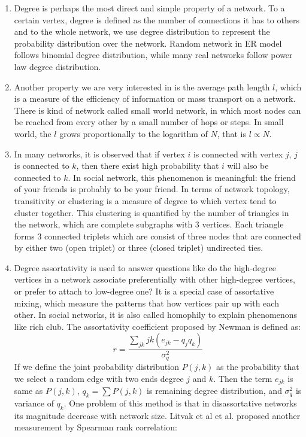 \documentclass[symmetry,article,submit,moreauthors,pdftex,10pt,a4paper]{Definitions/mdpi}
\makeatletter
\newcommand*{\etal}{%
    \@ifnextchar{.}%
        {et al}%
        {et al.\@\xspace}%
}
\makeatother
\begin{document}
\begin{enumerate}
\item Degree is perhaps the most direct and simple property of a network. To a certain vertex, degree is defined as the number of connections it has to others and to the whole network, we use degree distribution to represent the probability distribution over the network. Random network in ER model follows binomial degree distribution, while many real networks follow power law degree distribution.
\item Another property we are very interested in is the average path length $l$, which is a measure of the efficiency of information or mass transport on a network. There is kind of network called small world network, in which most nodes can be reached from every other by a small number of hops or steps. In small world, the $l$ grows proportionally  to the logarithm of $N$, that is $l\propto N$.
\item In many networks, it is observed that if vertex $i$ is connected with vertex $j$, $j$ is connected to $k$, then there exist high probability that $i$ will also be connected to $k$. In social network, this phenomenon is meaningful: the friend of your friends is probably to be your friend. In terms of network topology, transitivity or clustering is a measure of degree to which vertex tend to cluster together. This clustering is quantified by the number of triangles in the network, which are complete subgraphs with 3 vertices. Each triangle forms 3 connected triplets which are consist of three nodes that are connected by either two (open triplet) or three (closed triplet) undirected ties. 
\item Degree assortativity is used to answer questions like do the high-degree vertices in a network associate preferentially with other high-degree vertices, or prefer to attach to low-degree one? It is a special case of assortative mixing, which measure the patterns that how vertices pair up with each other. In social networks, it is also called homophily to explain phenomenons like rich club. The assortativity coefficient proposed by Newman is defined as:
\begin{equation}
\label{eq:ac1}
r = \frac{\sum_{jk}{jk (e_{jk} - q_j q_k)}}{\sigma_{q}^{2}}
\end{equation}
If we define the joint probability distribution $P(j,k)$ as the probability that we select a random edge with two ends degree $j$ and $k$. Then the term $e_{jk}$ is same as $P(j,k)$, $q_k=\sum P(j,k)$ is remaining degree distribution, and $\sigma_{q}^{2}$ is variance of $q_k$. One problem of this method is that in disassortative networks its magnitude decrease with network size. Litvak \etal proposed another measurement by Spearman rank correlation:

\end{enumerate}
\end{document}
